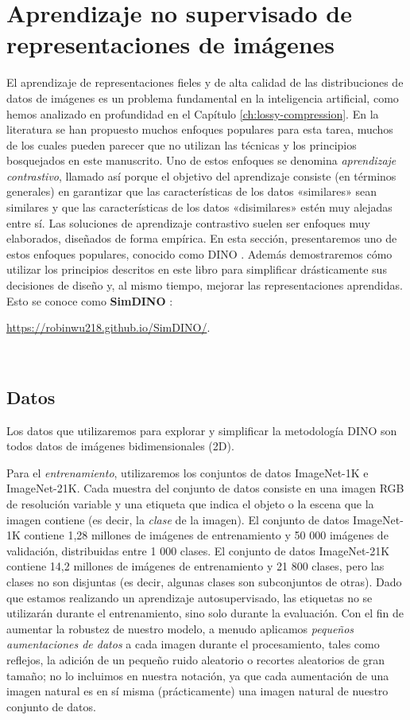 \documentclass[../../book-main_es.tex]{subfiles}
\begin{document}
\section{Aprendizaje no supervisado de
representaciones de imágenes}\label{sec:contrastive_learning}

El aprendizaje de representaciones fieles y de alta calidad de las distribuciones de datos de imágenes
es un problema fundamental en la inteligencia artificial, como
hemos analizado en profundidad en el Capítulo \ref{ch:lossy-compression}.
En la literatura se han propuesto muchos enfoques populares
para esta tarea, muchos de los cuales pueden parecer que no utilizan las técnicas y
los principios bosquejados en este manuscrito. Uno de estos enfoques se denomina
\textit{aprendizaje contrastivo}, llamado así porque el objetivo del aprendizaje 
consiste (en términos generales) en garantizar que las características de
los datos «similares» sean similares y que las características de los datos «disimilares» estén
muy alejadas entre sí. Las soluciones de aprendizaje contrastivo suelen ser 
enfoques muy elaborados, diseñados de forma empírica. En esta sección,
presentaremos uno de estos enfoques populares, conocido como DINO \citep{caron2021emerging}. 
Además demostraremos cómo utilizar los principios descritos en este libro para simplificar 
drásticamente sus decisiones de diseño y, al mismo tiempo, mejorar las representaciones aprendidas. 
Esto se conoce como \textbf{SimDINO} \cite{wu2025simplifying}:
\\
\centerline{\url{https://robinwu218.github.io/SimDINO/}.}\\

\subsection{Datos}\label{sub:contrastive_learning_data}
Los datos que utilizaremos para explorar y simplificar la metodología DINO
son todos datos de imágenes bidimensionales (2D).

Para el \textit{entrenamiento},
utilizaremos los conjuntos de datos ImageNet-1K e ImageNet-21K. Cada muestra del conjunto 
de datos consiste en una imagen RGB de resolución variable y una etiqueta que indica el objeto 
o la escena que la imagen contiene (es decir, la \textit{clase} de la imagen). El conjunto de 
datos ImageNet-1K contiene 1,28 millones de imágenes de entrenamiento y 50 000 imágenes de 
validación, distribuidas entre 1 000 clases. El conjunto de datos ImageNet-21K contiene 14,2 millones 
de imágenes de entrenamiento y 21 800 clases, pero las clases no son disjuntas (es decir, 
algunas clases son subconjuntos de otras). Dado que estamos realizando un aprendizaje 
autosupervisado, las etiquetas no se utilizarán durante el entrenamiento, sino solo durante 
la evaluación. Con el fin de aumentar la robustez de nuestro modelo, a menudo aplicamos 
\textit{pequeños aumentaciones de datos} a cada imagen durante el procesamiento, 
tales como reflejos, la adición de un pequeño ruido aleatorio o recortes aleatorios de 
gran tamaño; no lo incluimos en nuestra notación, ya que cada aumentación de una 
imagen natural es en sí misma (prácticamente) una imagen natural de nuestro conjunto de datos.
\end{document}
